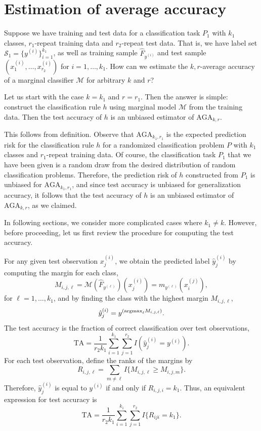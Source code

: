 \documentclass[12pt]{article}
\begin{document}
\section{Estimation of average accuracy}\label{sec:estimation_average_accuracy}

Suppose we have training and test data for a classification task $P_1$
with $k_1$ classes, $r_1$-repeat training data and $r_2$-repeat test
data.  That is, we have label set $\mathcal{S}_1 =
\{y^{(i)}\}_{i=1}^{k_1}$, as well as training sample $\hat{F}_{y^{(i)}}$
and test sample $(x_1^{(i)},\hdots, x_{r_2}^{(i)})$ for $i =
1,\hdots, k_1$.  How can we estimate the $k, r$-average accuracy of a
marginal classifier $\mathcal{M}$ for arbitrary $k$ and $r$?

Let us start with the case $k = k_1$ and $r = r_1$.  Then the answer
is simple: construct the classification rule $h$ using marginal model
$\mathcal{M}$ from the training data.  Then the test accuracy of $h$ is an
unbiased estimator of $\text{AGA}_{k,r}$.

This follows from definition.  Observe that $\text{AGA}_{k_1,r_1}$ is
the expected prediction risk for the classification rule $h$ for a
randomized classification problem $P$ with $k_1$ classes and
$r_1$-repeat training data.  Of course, the classification task $P_1$
that we have been given is a random draw from the desired
distribution of random classification problems.  Therefore, the
prediction risk of $h$ constructed from $P_1$ is unbiased for
$\text{AGA}_{k_1, r_1}$, and since test accuracy is unbiased for
generalization accuracy, it follows that the test accuracy of $h$ is
an unbiased estimator of $\text{AGA}_{k,r}$, as we claimed.

In following sections, we consider more complicated cases where $k_1
\neq k$.  However, before proceeding, let us first review the
procedure for computing the test accuracy.

For any given test observation $x_j^{(i)}$, we obtain the predicted
label $\hat{y}_j^{(i)}$ by computing the margin for each class,
\[
M_{i,j,\ell} = \mathcal{M}(\hat{F}_{y^{(\ell)}})(x_j^{(i)}) =  m_{y^{(\ell)}}(x_i^{(j)}),
\]
for $\ell = 1,\hdots, k_1$,
and by finding the class with the highest margin $M_{i, j, \ell}$,
\[
\hat{y}_j^{(i)} = y^{(\text{argmax}_\ell M_{i, j, \ell})}.
\]
The test accuracy is the fraction of correct classification over test observations,
\begin{equation}
\text{TA} = \frac{1}{r_2k_1} \sum_{i=1}^{k_1} \sum_{j=1}^{r_2} I(\hat{y}_j^{(i)} = y^{(i)}).
\end{equation}
For each test observation, define the ranks of the margins by
\[
R_{i,j,\ell} = \sum_{m \neq \ell} I\{M_{i,j,\ell} \geq M_{i, j, m}\}.
\]
Therefore, $\hat{y}_j^{(i)}$ is equal to $y^{(i)}$ if and only if $R_{i,j,i} = k_1$.
Thus, an equivalent expression for test accuracy is
\begin{equation}\label{eq:test_risk}
\text{TA} = \frac{1}{r_2 k_1} \sum_{i=1}^{k_1} \sum_{j=1}^{r_2} I\{R_{iji} = k_1\}.
\end{equation}
\end{document}
